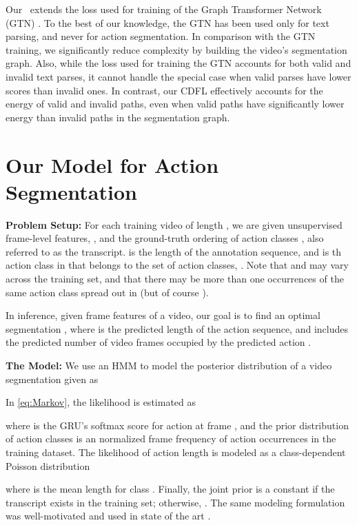 \documentclass[10pt,twocolumn,letterpaper]{article}
\begin{document}
Our \abbrmodel\ extends the loss used for training of the Graph Transformer Network (GTN) \cite{lecun1998gradient, le1997reading, bottou2005graph, collobert2011deep}. To the best of our knowledge, the GTN has been used only for text parsing, and never for action segmentation. In comparison with the GTN training, we significantly reduce complexity by building the video's segmentation graph. Also, while the loss used for training the GTN accounts for both valid and invalid text parses, it cannot handle the special case when valid parses have lower scores than invalid ones. In contrast, our CDFL effectively accounts for the energy of valid and invalid paths, even when valid paths have significantly lower energy than invalid paths in the segmentation graph. 



\section{Our Model for Action Segmentation}\label{sec:HMM}
\noindent
{\bf Problem Setup:} For each training video of length , we are given unsupervised frame-level features, , and the ground-truth ordering of action classes , also referred to as the transcript.   is the length of the annotation sequence, and  is th action class in   that belongs to the set of  action classes, . Note that  and  may vary across the training set, and that there may be more than one occurrences of the same action class spread out in  (but of course ).



In inference, given frame features  of a video,  our goal is to find an optimal segmentation ,  where  is the predicted length of the action sequence, and   includes the predicted number of video frames  occupied by the predicted action .


{\bf The Model:} We use an HMM to model the posterior distribution of a video segmentation  given   as

In \eqref{eq:Markov}, the likelihood  is estimated as

where  is the GRU's softmax score for action  at frame , and the prior distribution of action classes  is an normalized frame frequency of action occurrences in the training dataset. The likelihood of action length is modeled as a class-dependent Poisson distribution 

where  is the mean length for class . Finally, the joint prior  is a constant if the transcript  exists in the training set; otherwise, . The same modeling formulation was well-motivated and used in state of the art \cite{richard2018neuralnetwork}.
\end{document}
